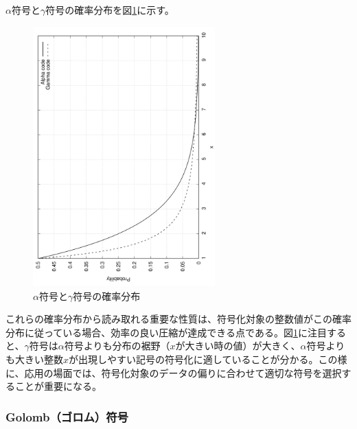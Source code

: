 \documentclass[uplatex,dvipdfmx,b5j,10pt]{jsbook}
\theoremstyle{definition}
\begin{document}
$\alpha$符号と$\gamma$符号の確率分布を図\ref{alpha_gamma_code_dist}に示す。
\begin{figure}[htbp]
  \begin{center}
    \includegraphics[width=70mm,angle=-90]{./figs/alpha_gamma_code_dist.png}
  \end{center}
  \caption{$\alpha$符号と$\gamma$符号の確率分布} \label{alpha_gamma_code_dist}
\end{figure}

これらの確率分布から読み取れる重要な性質は、符号化対象の整数値がこの確率分布に従っている場合、効率の良い圧縮が達成できる点である。図\ref{alpha_gamma_code_dist}に注目すると、$\gamma$符号は$\alpha$符号よりも分布の裾野（$x$が大きい時の値）が大きく、$\alpha$符号よりも大きい整数$x$が出現しやすい記号の符号化に適していることが分かる。この様に、応用の場面では、符号化対象のデータの偏りに合わせて適切な符号を選択することが重要になる。

\subsubsection{Golomb（ゴロム）符号}
\end{document}
